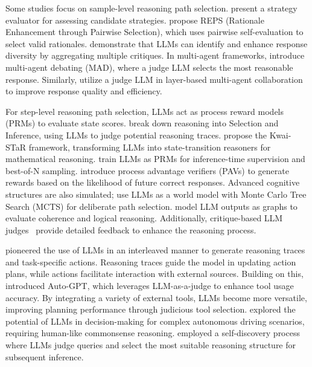 \documentclass[acmsmall,screen]{acmart}
\begin{document}
Some studies focus on sample-level reasoning path selection. \citet{gao2023strategyllm} present a strategy evaluator for assessing candidate strategies. \citet{kawabata2024rationale} propose REPS (Rationale Enhancement through Pairwise Selection), which uses pairwise self-evaluation to select valid rationales. \citet{lahoti2023improving} demonstrate that LLMs can identify and enhance response diversity by aggregating multiple critiques. In multi-agent frameworks, \citet{liang2023encouraging} introduce multi-agent debating (MAD), where a judge LLM selects the most reasonable response. Similarly, \citet{li2024smoa} utilize a judge LLM in layer-based multi-agent collaboration to improve response quality and efficiency.

For step-level reasoning path selection, LLMs act as process reward models (PRMs) to evaluate state scores. \citet{creswell2022selection} break down reasoning into Selection and Inference, using LLMs to judge potential reasoning traces. \citet{xie2024improving} propose the Kwai-STaR framework, transforming LLMs into state-transition reasoners for mathematical reasoning. \citet{let_verify_step} train LLMs as PRMs for inference-time supervision and best-of-N sampling. \citet{setlur2024rewarding} introduce process advantage verifiers (PAVs) to generate rewards based on the likelihood of future correct responses. Advanced cognitive structures are also simulated; \citet{hao2023reasoning} use LLMs as a world model with Monte Carlo Tree Search (MCTS) for deliberate path selection. \citet{besta2024graph} model LLM outputs as graphs to evaluate coherence and logical reasoning.
Additionally, critique-based LLM judges~\cite{ankner2024critique,lancriticeval,yao2024mcqg,yuksel2024multi} provide detailed feedback to enhance the reasoning process.

\citet{yao2022react} pioneered the use of LLMs in an interleaved manner to generate reasoning traces and task-specific actions. Reasoning traces guide the model in updating action plans, while actions facilitate interaction with external sources. Building on this, \citet{yang2023auto} introduced Auto-GPT, which leverages LLM-as-a-judge to enhance tool usage accuracy. By integrating a variety of external tools, LLMs become more versatile, improving planning performance through judicious tool selection. \citet{sha2023languagempc} explored the potential of LLMs in decision-making for complex autonomous driving scenarios, requiring human-like commonsense reasoning. \citet{zhou2024self} employed a self-discovery process where LLMs judge queries and select the most suitable reasoning structure for subsequent inference.
\end{document}
